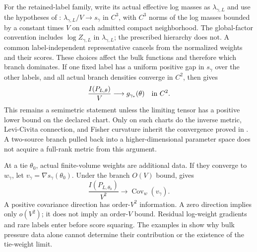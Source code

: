 For the retained-label family, write its actual effective log masses as
$\lambda_{\gamma,L}$ and use the hypotheses of
:
$\lambda_{\gamma,L}/V\to s_\gamma$ in $C^3$, with $C^3$ norms of the
log masses bounded by a constant times $V$ on each admitted compact
neighborhood. The global-factor convention includes $\log Z_{\gamma,L}$
in $\lambda_{\gamma,L}$; the prescribed hierarchy does not. A common
label-independent representative cancels from the normalized weights
and their scores. These choices affect the bulk functions and therefore
which branch dominates. If one fixed label has a uniform positive gap
in $s_\gamma$ over the other labels, and all actual branch densities
converge in $C^2$, then
 gives
\begin{equation}
 \frac{I(P_{L,\theta})}{V}\longrightarrow g_{\gamma_*}(\theta)
 \quad\hbox{in }C^2.
 \label{eq:rg-thermo-draft-strict-density}
\end{equation}
This remains a semimetric statement unless the limiting tensor has a
positive lower bound on the declared chart. Only on such charts do the
inverse metric, Levi-Civita connection, and Fisher curvature inherit
the convergence proved in .
A two-source branch pulled back into a higher-dimensional parameter
space does not acquire a full-rank metric from this argument.\thermoestablishedstatus

At a tie $\theta_0$, actual finite-volume weights are additional data.
If they converge to $w_\gamma$, let
$v_\gamma=\nabla s_\gamma(\theta_0)$. Under the branch $O(V)$ bound,
 gives
\begin{equation}
 \frac{I(P_{L,\theta_0})}{V^2}
 \longrightarrow \operatorname{Cov}_{w}(v_\gamma).
 \label{eq:rg-thermo-draft-tie-density}
\end{equation}
A positive covariance direction has order-$V^2$ information. A zero
direction implies only $o(V^2)$; it does not imply an order-$V$ bound.
Residual log-weight gradients and rare labels enter before score
squaring. The examples in  show why
bulk pressure data alone cannot determine their contribution or the
existence of the tie-weight limit.\thermoestablishedstatus

